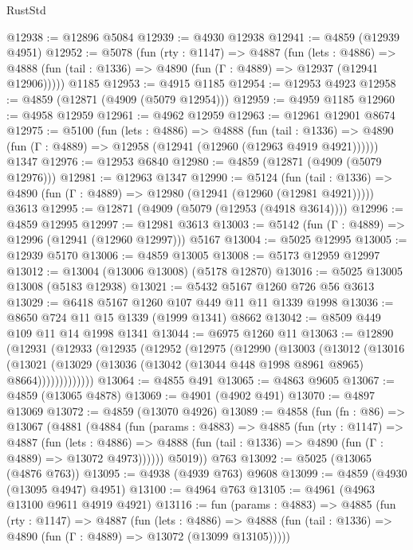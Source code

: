 \begin{lexlean}{RustStd}
\begin{coremodule}
@12938 := @12896 @5084
@12939 := @4930 @12938
@12941 := @4859 (@12939 @4951)
@12952 := @5078
    (fun (rty : @1147) =>
    @4887
      (fun (lets : @4886) =>
      @4888 (fun (tail : @1336) => @4890 (fun (Γ : @4889) => @12937 (@12941 @12906)))))
    @1185
@12953 := @4915 @1185
@12954 := @12953 @4923
@12958 := @4859 (@12871 (@4909 (@5079 @12954)))
@12959 := @4959 @1185
@12960 := @4958 @12959
@12961 := @4962 @12959
@12963 := @12961 @12901 @8674
@12975 := @5100
    (fun (lets : @4886) =>
    @4888
      (fun (tail : @1336) =>
      @4890 (fun (Γ : @4889) => @12958 (@12941 (@12960 (@12963 @4919 @4921))))))
    @1347
@12976 := @12953 @6840
@12980 := @4859 (@12871 (@4909 (@5079 @12976)))
@12981 := @12963 @1347
@12990 := @5124
    (fun (tail : @1336) => @4890 (fun (Γ : @4889) => @12980 (@12941 (@12960 (@12981 @4921)))))
    @3613
@12995 := @12871 (@4909 (@5079 (@12953 (@4918 @3614))))
@12996 := @4859 @12995
@12997 := @12981 @3613
@13003 := @5142 (fun (Γ : @4889) => @12996 (@12941 (@12960 @12997))) @5167
@13004 := @5025 @12995
@13005 := @12939 @5170
@13006 := @4859 @13005
@13008 := @5173 @12959 @12997
@13012 := @13004 (@13006 @13008) (@5178 @12870)
@13016 := @5025 @13005 @13008 (@5183 @12938)
@13021 := @5432 @5167 @1260 @726 @56 @3613
@13029 := @6418 @5167 @1260 @107 @449 @11 @11 @1339 @1998
@13036 := @8650 @724 @11 @15 @1339 (@1999 @1341) @8662
@13042 := @8509 @449 @109 @11 @14 @1998 @1341
@13044 := @6975 @1260 @11
@13063 := @12890
    (@12931
      (@12933
        (@12935
          (@12952
            (@12975
              (@12990
                (@13003
                  (@13012
                    (@13016
                      (@13021
                        (@13029 (@13036 (@13042 (@13044 @448 @1998 @8961 @8965) @8664)))))))))))))
@13064 := @4855 @491
@13065 := @4863 @9605
@13067 := @4859 (@13065 @4878)
@13069 := @4901 (@4902 @491)
@13070 := @4897 @13069
@13072 := @4859 (@13070 @4926)
@13089 := @4858
    (fun (fn : @86) =>
    @13067
      (@4881
        (@4884
          (fun (params : @4883) =>
          @4885
            (fun (rty : @1147) =>
            @4887
              (fun (lets : @4886) =>
              @4888 (fun (tail : @1336) => @4890 (fun (Γ : @4889) => @13072 @4973))))))
        @5019))
    @763
@13092 := @5025 (@13065 (@4876 @763))
@13095 := @4938 (@4939 @763) @9608
@13099 := @4859 (@4930 (@13095 @4947) @4951)
@13100 := @4964 @763
@13105 := @4961 (@4963 @13100 @9611 @4919 @4921)
@13116 := fun (params : @4883) =>
  @4885
    (fun (rty : @1147) =>
    @4887
      (fun (lets : @4886) =>
      @4888 (fun (tail : @1336) => @4890 (fun (Γ : @4889) => @13072 (@13099 @13105)))))

\end{coremodule}
\end{lexlean}
